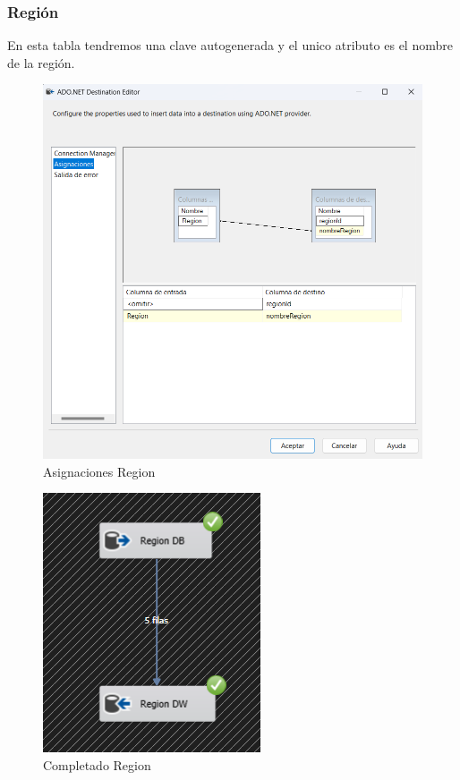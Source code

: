 \documentclass{article}
\begin{document}
	\subsubsection{Región}
	En esta tabla tendremos una clave autogenerada y el unico atributo es el nombre de la región.
	\begin{figure}[H]
		\centering
		\includegraphics[width=.7\linewidth]{./images/asignaciones/region.png}
		\caption{Asignaciones Region}
	\end{figure}
	\begin{figure}[H]
		\centering
		\includegraphics[width=.3\linewidth]{./images/completados/region.png}
		\caption{Completado Region}
	\end{figure}
\end{document}
